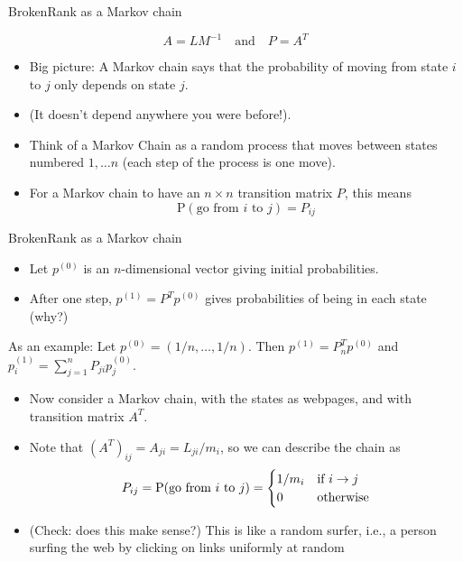 \documentclass[mathserif]{beamer}
\def\P{\mathrm{P}}
\def\red{\color[rgb]{0.8,0,0}}
\begin{document}
\begin{frame}{BrokenRank as a Markov chain}
\smallskip

$$A = LM^{-1} \quad \text{and} \quad P = A^{T}$$

\begin{itemize}
\item Big picture: A Markov chain says that the probability of moving from state $i$ to $j$ only depends on state $j.$ 
\item (It doesn't depend anywhere you were before!).
\item Think of a {\red Markov Chain} as a
random process that moves between states
numbered $1,\ldots n$ (each step of the
process is one move).
\item For a Markov chain to have an
$n \times n$
transition matrix $P$, this means 
$$\P(\text{go from $i$ to $j$}) = P_{ij}$$
\end{itemize}

\end{frame}

\begin{frame}{BrokenRank as a Markov chain}
\begin{itemize}
\item Let $p^{(0)}$ is an $n$-dimensional 
vector giving initial probabilities. 
\item After one
step, $p^{(1)} = P^T p^{(0)}$ gives probabilities of being in each
state (why?)
\end{itemize}

As an example:
Let $p^{(0)} = (1/n, \ldots, 1/n).$
Then $p^{(1)} = P_n^T p^{(0)}$
and $p_i^{(1)} = \sum_{j=1}^n P_{ji} p_j^{(0)}.$

\bigskip
\begin{itemize}
\item Now consider a Markov chain, with the states
as webpages, and with {\red transition matrix $A^T$.} 
\item Note that $(A^T)_{ij}=A_{ji}=L_{ji}/m_i$,
so we can describe the chain as
\vspace{-5pt}
$$ P_{ij} = \P(\text{go from $i$ to $j$}) =
\begin{cases}
1/m_i & \text{if $i \rightarrow j$} \\
0 & \text{otherwise}
\end{cases}
\vspace{-5pt}$$
\item (Check: does this make sense?)
This is like a {\red random surfer,}
i.e., a person surfing the web by clicking
on links uniformly at random
\end{itemize}
\end{frame}
\end{document}
